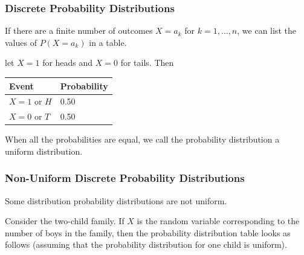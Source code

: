 \documentclass[xcolor=dvipsnames]{beamer}
\begin{document}
\begin{frame}
  \frametitle{Discrete Probability Distributions}
  If there are a finite number of outcomes $X=a_{k}$ for
  $k=1,\ldots,n$, we can list the values of $P(X=a_{k})$ in a table. 

\bigskip

\label{ex:ootiteij} let $X=1$ for heads and $X=0$
for tails. Then 

\bigskip

\begin{tabular}{|l|l|}\hline
  Event & Probability \\ \hline
  $X=1$ or $H$ & 0.50 \\ \hline
  $X=0$ or $T$ & 0.50 \\ \hline
\end{tabular}

\bigskip

When all the probabilities are equal, we call the probability
distribution a \alert{uniform distribution}.
\end{frame}

\begin{frame}
  \frametitle{Non-Uniform Discrete Probability Distributions}
  Some distribution probability distributions are not uniform.

\bigskip

  \label{ex:shaisail} Consider the
  two-child family. If $X$ is the random variable corresponding to the
  number of boys in the family, then the probability distribution
  table looks as follows (assuming that the probability distribution
  for one child is uniform).
\end{frame}
\end{document}
